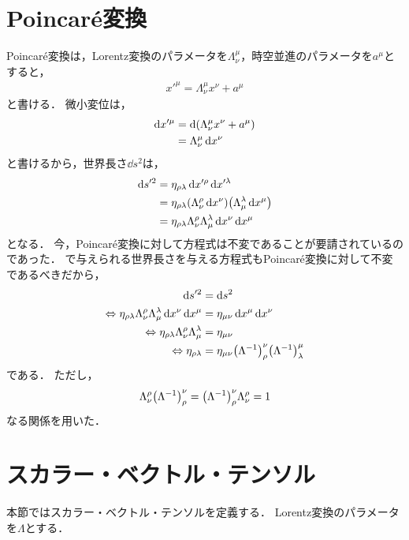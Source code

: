 \documentclass{report}
\begin{document}
  \section{Poincar\'e変換}
    Poincar\'e変換は，Lorentz変換のパラメータを$\Lambda_{\nu}^{\mu}$，時空並進のパラメータを$a^{\mu}$とすると，
    \begin{align}
      x'^{\mu} = \Lambda_{\nu}^{\mu}x^{\nu} + a^{\mu}
    \end{align}
    と書ける．
    微小変位は，
    \begin{align}
      \dd{x'^{\mu}} &= \dd{\qty(\Lambda_{\nu}^{\mu}x^{\nu} + a^{\mu})} \\ 
      &= \Lambda_{\nu}^{\mu}\dd{x^{\nu}}
    \end{align}
    と書けるから，世界長さ$\dd{s^2}$は，
    \begin{align}
      \dd{s'^2} &= \eta_{\rho\lambda}\dd{x'^{\rho}}\dd{x'^{\lambda}} \\ 
      &= \eta_{\rho\lambda}\qty(\Lambda_{\nu}^{\rho}\dd{x^{\nu}})\qty(\Lambda_{\mu}^{\lambda}\dd{x^{\mu}}) \\ 
      &= \eta_{\rho\lambda}\Lambda_{\nu}^{\rho}\Lambda_{\mu}^{\lambda}\dd{x^{\nu}}\dd{x^{\mu}}
    \end{align}
    となる．
    今，Poincar\'e変換に対して方程式は不変であることが要請されているのであった．
    で与えられる世界長さを与える方程式もPoincar\'e変換に対して不変であるべきだから，
    \begin{align}
      \dd{s'^2} &= \dd{s^2} \\ 
      \Leftrightarrow \eta_{\rho\lambda}\Lambda_{\nu}^{\rho}\Lambda_{\mu}^{\lambda}\dd{x^{\nu}}\dd{x^{\mu}} &= \eta_{\mu\nu}\dd{x^{\mu}}\dd{x^{\nu}} \\ 
      \Leftrightarrow \eta_{\rho\lambda}\Lambda_{\nu}^{\rho}\Lambda_{\mu}^{\lambda} &= \eta_{\mu\nu} \\ 
      \Leftrightarrow \eta_{\rho\lambda} &= \eta_{\mu\nu}\qty(\Lambda^{-1})_{\rho}^{\nu}\qty(\Lambda^{-1})_{\lambda}^{\mu}
    \end{align}
    である．
    ただし，
    \begin{align}
      \Lambda_{\nu}^{\rho}\qty(\Lambda^{-1})_{\rho}^{\nu} = \qty(\Lambda^{-1})_{\rho}^{\nu}\Lambda_{\nu}^{\rho} = 1
    \end{align}
    なる関係を用いた．
  \section{スカラー・ベクトル・テンソル}
    本節ではスカラー・ベクトル・テンソルを定義する．
    Lorentz変換のパラメータを$\Lambda$とする．
\end{document}
